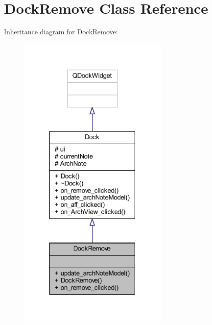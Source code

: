 \hypertarget{class_dock_remove}{}\section{Dock\+Remove Class Reference}
\label{class_dock_remove}


Inheritance diagram for Dock\+Remove\+:\nopagebreak
\begin{figure}[H]
\begin{center}
\leavevmode
\includegraphics[width=211pt]{class_dock_remove__inherit__graph}
\end{center}
\end{figure}


